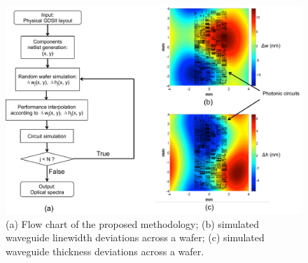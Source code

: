 \documentclass[journal]{spie}
\begin{document}
\begin{figure}[h]
    \centering
    \label{flow_chart}\includegraphics[width=\linewidth]{flow_chart.pdf}
    \caption{(a) Flow chart of the proposed methodology; (b) simulated waveguide linewidth deviations across a wafer; (c) simulated waveguide thickness deviations across a wafer.}
    \label{flow_chart}  
\end{figure}
\end{document}
